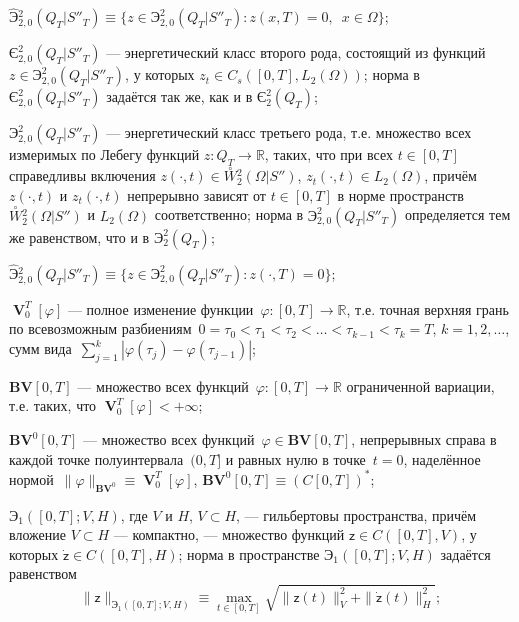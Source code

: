 \documentclass{report}
\newcommand{\Var}{\mathop{\mathbf{V}}\nolimits}
\begin{document}
$\hat{\textrm{Э}}{}^{2}_{2,0}(Q_T|S''_T)\equiv\{z\in \textrm{Э}^{2}_{2,0}(Q_T|S''_T):z(x,T)=0,\,\,\,x\in\Omega\}$;


$\textrm{Є}^{2}_{2,0}(Q_T|S''_T)$ --- \glqq энергетический класс второго рода\grqq, состоящий из функций $z\in \textrm{Э}^{2}_{2,0}(Q_T|S''_T)$, у которых
$z_t\in C_s([0,T],L_2(\Omega))$; норма в $\textrm{Є}^{2}_{2,0}(Q_T|S''_T)$ задаётся так же, как и в $\textrm{Є}^{2}_{2}(Q_T)$;


$\textbf{Э}^{2}_{2,0}(Q_T|S''_T)$ --- \glqq энергетический класс третьего рода\grqq, т.е. множество всех измеримых по Лебегу функций $z\colon Q_T\to \mathbb{R}$, таких, что при всех
$t\in[0,T]$ справедливы включения $z(\cdot,t)\in\stackrel{\circ}{W}\!\!^2_2(\Omega|S'')$, $z_t(\cdot,t)\in L_2(\Omega)$, причём $z(\cdot,t)$ и $z_t(\cdot,t)$ непрерывно зависят от
$t\in[0,T]$ в норме пространств $\stackrel{\circ}{W}\!\!^2_2(\Omega|S'')$ и $L_2(\Omega)$ соответственно; норма в $\textbf{Э}^{2}_{2,0}(Q_T|S''_T)$ определяется
тем же равенством, что и в $\textbf{Э}^{2}_{2}(Q_T)$;


$\hat{\textbf{Э}}{}^{2}_{2,0}(Q_T|S''_T)\equiv\{z\in\textbf{Э}^{2}_{2,0}(Q_T|S''_T):z(\cdot,T)=0\}$;

$\Var^{T}_{0}[\varphi]$ --- полное изменение функции~$\varphi\colon[0,T]\to \mathbb{R}$, т.е. точная верхняя грань по всевозможным разбиениям~$0=\tau_0<\tau_1<\tau_2<\dots<\tau_{k-1} <
\tau_k=T$, $k=1,2,\dots$, сумм вида~$\sum\limits_{j=1}^k|\varphi(\tau_j)-\varphi(\tau_{j-1})|$;

$\mathbf{BV}[0,T]$ --- множество всех функций~$\varphi\colon[0,T]\to \mathbb{R}$ ограниченной вариации, т.е. таких, что $\Var^{T}_{0}[\varphi]<+\infty$;

$\mathbf{BV}^0[0,T]$ --- множество всех функций~$\varphi\in \mathbf{BV}[0,T]$, непрерывных справа в каждой точке полуинтервала~$(0,T]$ и равных нулю в точке~$t=0$, наделённое
нормой~$\|\varphi\|_{\mathbf{BV}^0}\equiv\Var^{T}_{0}[\varphi]$, $\mathbf{BV}^0[0,T]\equiv (C[0,T])^*$;


$\textbf{Э}_1([0,T];V,H)$, где $V$ и $H$, $V\subset H$, --- гильбертовы пространства, причём вложение $V\subset H$ --- компактно, --- множество функций $\textsf{z}\in C([0,T],V)$, у
которых $\dot{\textsf{z}}\in C([0,T],H)$; норма в пространстве $\textbf{Э}_1([0,T];V,H)$ задаётся равенством
$$
\|\textsf{z}\|_{\textbf{Э}_1([0,T];V,H)}\equiv\max\limits_{t\in[0,T]}\sqrt{\|\textsf{z}(t)\|^2_V+\|\dot{\textsf{z}}(t)\|^2_H};
$$
\end{document}
